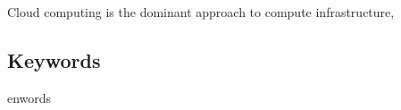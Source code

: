 \chapter*{}
\begin{otherlanguage}{english}
	

	Cloud computing is the dominant approach to compute infrastructure,

	\section*{Keywords}

	\noindent
	en{words}
\end{otherlanguage}
